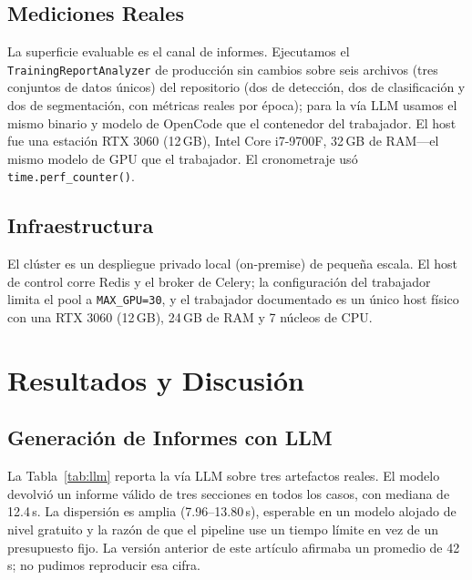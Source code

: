 \documentclass[10pt,twocolumn,letterpaper]{article}
\begin{document}
\subsection{Mediciones Reales}
La superficie evaluable es el canal de informes. Ejecutamos el \texttt{TrainingReportAnalyzer} de producción sin cambios sobre seis archivos (tres conjuntos de datos únicos) del repositorio (dos de detección, dos de clasificación y dos de segmentación, con métricas reales por época); para la vía LLM usamos el mismo binario y modelo de OpenCode que el contenedor del trabajador. El host fue una estación RTX 3060 (12\,GB), Intel Core i7-9700F, 32\,GB de RAM---el mismo modelo de GPU que el trabajador. El cronometraje usó \texttt{time.perf\_counter()}.

\subsection{Infraestructura}
El clúster es un despliegue privado local (on-premise) de pequeña escala. El host de control corre Redis y el broker de Celery; la configuración del trabajador limita el pool a \texttt{MAX\_GPU=30}, y el trabajador documentado es un único host físico con una RTX 3060 (12\,GB), 24\,GB de RAM y 7 núcleos de CPU.

\section{Resultados y Discusión}
\subsection{Generación de Informes con LLM}
La Tabla~\ref{tab:llm} reporta la vía LLM sobre tres artefactos reales. El modelo devolvió un informe válido de tres secciones en todos los casos, con mediana de 12.4\,s. La dispersión es amplia (7.96--13.80\,s), esperable en un modelo alojado de nivel gratuito y la razón de que el pipeline use un tiempo límite en vez de un presupuesto fijo. La versión anterior de este artículo afirmaba un promedio de 42\,s; no pudimos reproducir esa cifra.

\begin{table}[htbp]
\centering
\caption{Generación de informes con LLM sobre artefactos reales \texttt{results.csv} (prompt de producción)}
\label{tab:llm}
\end{table}
\end{document}
